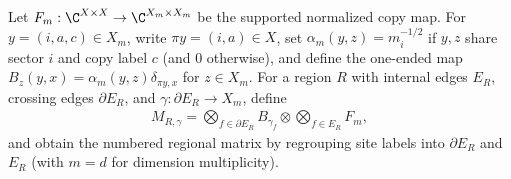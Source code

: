 \begin{definition}%
    \label{def:peps_copy_regional_matrix}
    \leanok
    Let $F_m:\C^{X\times X}\to\C^{X_m\times X_m}$ be the supported normalized copy map. For $y=(i,a,c)\in X_m$, write $\pi y=(i,a)\in X$, set $\alpha_m(y,z)=m_i^{-1/2}$ if $y,z$ share sector $i$ and copy label $c$ (and $0$ otherwise), and define the one-ended map $B_z(y,x)=\alpha_m(y,z)\delta_{\pi y,x}$ for $z\in X_m$. For a region $R$ with internal edges $E_R$, crossing edges $\partial E_R$, and $\gamma:\partial E_R\to X_m$, define
    \begin{align}
        M_{R,\gamma}
        =\bigotimes_{f\in\partial E_R}B_{\gamma_f}
        \otimes\bigotimes_{f\in E_R}F_m,
        \label{eq:peps_copy_regional_matrix}
    \end{align}
    and obtain the numbered regional matrix by regrouping site labels into $\partial E_R$ and $E_R$ (with $m=d$ for dimension multiplicity).
\end{definition}

